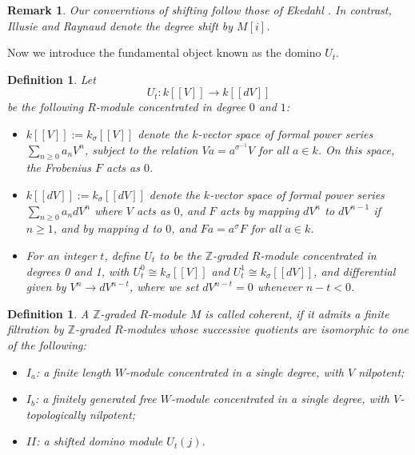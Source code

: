 \documentclass[a4paper,12pt,twoside]{report}
\newtheorem{definition}[theorem]{Definition}
\newtheorem{remark}[theorem]{Remark}
\newcommand{\Z}{\mathbb{Z}}
\begin{document}
\begin{remark}
    Our converntions of shifting follow those of Ekedahl \cite{Ek1,Ek2,Ek3}. 
    In contrast, Illusie and Raynaud \cite{Il1,IR} denote the degree shift by $M[i]$. 
\end{remark}

Now we introduce the fundamental object known as the domino $U_t$.

\begin{definition}\label{Ut}
Let \[U_t: k[[V]]\rightarrow k[[dV]]\] be the following $R$-module concentrated in degree $0$ and $1$: 
\begin{itemize}
    \item $k[[V]]:=k_{\sigma}[[V]]$ denote the $k$-vector space of formal power series $\sum_{n\geqslant 0} a_n V^n$, 
         subject to the relation $Va=a^{\sigma^{-1}}V$ for all $a\in k$. 
        On this space, the Frobenius $F$ acts as $0$. 
    \item  $k[[dV]]:=k_{\sigma}[[dV]]$ denote the $k$-vector space of formal power series $\sum_{n\geqslant 0}a_n dV^n$  
        where $V$ acts as $0$, and 
        $F$ acts by mapping $dV^n$ to $dV^{n-1}$ if $n\geq 1$, and by mapping $d$ to $0$, and $Fa=a^{\sigma}F$ for all $a\in k$. 
    \item For an integer $t$, define $U_t$ to be the $\Z$-graded $R$-module concentrated in degrees 0 and 1, 
with $U_t^0\cong k_{\sigma}[[V]]$ and $U_t^1\cong k_{\sigma}[[dV]]$, and 
differential given by $V^n \rightarrow dV^{n-t}$, where we set $dV^{n-t}=0$ whenever $n-t<0$.
\end{itemize} 

\end{definition}
\begin{definition}
    \label{Coherence}
A $\Z$-graded $R$-module $M$ is called {\em coherent}, if it admits a finite filtration 
by $\Z$-graded $R$-modules whose successive quotients 
are isomorphic to one of the following:
    \begin{itemize}
        \item $I_a$: a finite length $W$-module concentrated in a single degree, with $V$ nilpotent;
        \item $I_b$: a finitely generated free $W$-module concentrated in a single degree, 
        with $V$-topologically nilpotent;
        \item $II$: a shifted domino module $U_t(j)$.
    \end{itemize}
\end{definition}
\end{document}
